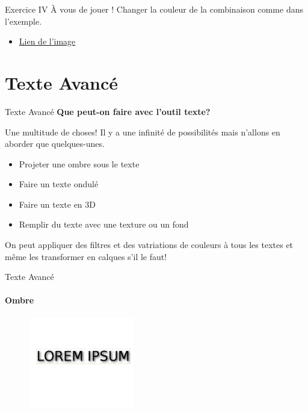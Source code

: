 \documentclass[10pt,svgnames,usenames,table]{beamer}
\begin{document}
	\begin{frame}{Exercice IV}
		À vous de jouer ! Changer la couleur de la combinaison comme dans l'exemple.
		\begin{itemize}
			\item \href{http://louvainlinux.github.io/atelier-gimp/src/Images/colours/col5.jpg}{Lien de l'image}
		\end{itemize}
	\end{frame}




\section{Texte Avancé}
	\begin{frame}{Texte Avancé}
		\textbf{Que peut-on faire avec l'outil texte?}		

		Une multitude de choses! Il y a une infinité de possibilités mais n'allons en aborder que quelques-unes.
		\begin{itemize}
			\item Projeter une ombre sous le texte
			\item Faire un texte ondulé
			\item Faire un texte en 3D
			\item Remplir du texte avec une texture ou un fond
		\end{itemize}
		
		On peut appliquer des filtres et des vatriations de couleurs à tous les textes et même les transformer en calques s'il le faut!
	\end{frame}


\begin{frame}{Texte Avancé}
		\framesubtitle{Ombre}
		\begin{figure}
		\centering
		\includegraphics[height=150px]{Images/text/ombre1}
		\end{figure}
\end{frame}
\end{document}
